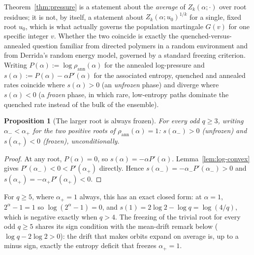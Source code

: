 \documentclass[11pt]{article}
\newtheorem{proposition}[theorem]{Proposition}
\theoremstyle{remark}
\begin{document}
Theorem~\ref{thm:pressure} is a statement about the \emph{average} of
$Z_k(\alpha;\cdot)$ over root residues; it is not, by itself, a
statement about $Z_k(\alpha;u_0)^{1/k}$ for a single, fixed root
$u_0$, which is what actually governs the population martingale
$G(v)$ for one specific integer $v$. Whether the two coincide is
exactly the quenched-versus-annealed question familiar from directed
polymers in a random environment and from Derrida's random energy
model, governed by a standard freezing criterion. Writing
$P(\alpha):=\log\rho_{\mathrm{ann}}(\alpha)$ for the annealed
log-pressure and $s(\alpha):=P(\alpha)-\alpha P'(\alpha)$ for the
associated entropy, quenched and annealed rates coincide where
$s(\alpha)>0$ (an \emph{unfrozen} phase) and diverge where
$s(\alpha)<0$ (a \emph{frozen} phase, in which rare, low-entropy paths
dominate the quenched rate instead of the bulk of the ensemble).

\begin{proposition}[The larger root is always frozen]\label{prop:always-frozen}
For every odd $q\ge3$, writing $\alpha_-<\alpha_+$ for the two positive
roots of $\rho_{\mathrm{ann}}(\alpha)=1$: $s(\alpha_-)>0$ (unfrozen) and
$s(\alpha_+)<0$ (frozen), unconditionally.
\end{proposition}
\begin{proof}
At any root, $P(\alpha)=0$, so $s(\alpha)=-\alpha P'(\alpha)$.
Lemma~\ref{lem:log-convex} gives $P'(\alpha_-)<0<P'(\alpha_+)$
directly. Hence
$s(\alpha_-)=-\alpha_-P'(\alpha_-)>0$ and
$s(\alpha_+)=-\alpha_+P'(\alpha_+)<0$.
\end{proof}

For $q\ge5$, where $\alpha_+=1$ always, this has an exact closed form:
at $\alpha=1$, $2^\alpha-1=1$ so $\log(2^\alpha-1)=0$, and
$s(1)=2\log2-\log q=\log(4/q)$, which is negative exactly when $q>4$.
The freezing of the trivial root for every odd $q\ge5$ shares its sign
condition with the mean-drift remark below ($\log q-2\log2>0$): the
drift that makes orbits expand on average is, up to a minus sign,
exactly the entropy deficit that freezes $\alpha_+=1$.
\end{document}

